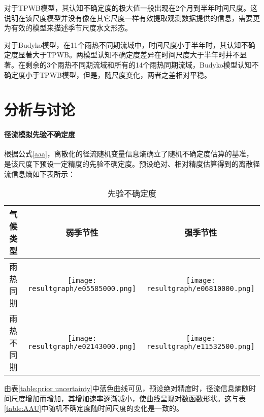 对于TPWB模型，其认知不确定度的极大值一般出现在2个月到半年时间尺度。这说明在该尺度模型并没有像在其它尺度一样有效提取观测数据提供的信息，需要更为有效的模型来描述季节尺度水文形态。

对于Budyko模型，在11个雨热不同期流域中，时间尺度小于半年时，其认知不确定度显著大于TPWB。两模型认知不确定度差异在时间尺度大于半年时并不显著。在剩余的3个雨热不同期流域和所有的14个雨热同期流域，Budyko模型认知不确定度小于TPWB模型，但是，随尺度变化，两者之差相对平稳。


\section{分析与讨论}
\paragraph{径流模拟先验不确定度}
根据公式\ref{aaa}，离散化的径流随机变量信息熵确立了随机不确定度估算的基准，是该尺度下预设一定精度的先验不确定度。预设绝对、相对精度估算得到的离散径流信息熵如下表所示：

\begin{table}[H]\small
\caption{先验不确定度}
\label{table:prior uncertainty}
\resizebox{\textwidth}{!}
{
\label{EN}
\centering
\begin{tabular}{ccc}
\toprule[1.5 pt]
气候类型& 弱季节性 & 强季节性 \\\midrule[1 pt]
雨热同期
&\begin{minipage}{.6\textwidth}\texttt{[image: resultgraph/e05585000.png]}\end{minipage}

&\begin{minipage}{.6\textwidth}\texttt{[image: resultgraph/e06810000.png]}\end{minipage}
\\
雨热不同期
&\begin{minipage}{.6\textwidth}\texttt{[image: resultgraph/e02143000.png]}\end{minipage}
 
&\begin{minipage}{.6\textwidth}\texttt{[image: resultgraph/e11532500.png]}\end{minipage}
\\
\bottomrule[1.5 pt]
\end{tabular}
}
\end{table}

由表\ref{table:prior uncertainty}中蓝色曲线可见，预设绝对精度时，径流信息熵随时间尺度增加而增加，其增加速率逐渐减小，使曲线呈现对数函数形状。这与表\ref{table:AAU}中随机不确定度随时间尺度的变化是一致的。

